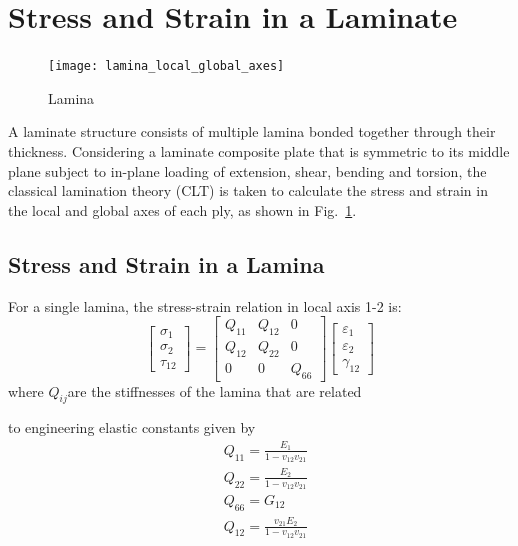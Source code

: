 \documentclass[Afour,sagev,times]{sagej}
\begin{document}
\section{Stress and Strain in a Laminate}
\begin{figure}[!htb]
	\centering
	\texttt{[image: lamina\_local\_global\_axes]}
\caption{Lamina}
  	\label{fig:lamina}
\end{figure}
A laminate structure consists of multiple lamina bonded together through their thickness.
Considering a laminate composite plate that is symmetric to its middle plane subject to in-plane
loading of extension, shear, bending and torsion, the classical lamination theory (CLT) is taken to
calculate the stress and strain in the local and global axes of each ply, as shown in
Fig.~\ref{fig:lamina}.




\subsection{Stress and Strain in a Lamina}
For a single lamina, the stress-strain relation in local axis 1-2 is:
\begin{equation}
    \begin{bmatrix}
        \sigma _1\\
        \sigma _2\\
        \tau_{12}
    \end{bmatrix}
    =
    \begin{bmatrix}
        Q_{11} & Q_{12} & 0\\
        Q_{12} & Q_{22} & 0\\
        0      &  0     & Q_{66}
    \end{bmatrix}
    \begin{bmatrix}
        \varepsilon_1\\
        \varepsilon_2\\\gamma_{12}
    \end{bmatrix}
\end{equation}
where $Q_{ij} $are the stiffnesses of the lamina that are related

to engineering elastic constants given by
\begin{equation}
    \begin{split}
    &Q_{11}=\frac{E_1}{1-v_{12}v_{21}}\\
    &Q_{22}=\frac{E_2}{1-v_{12}v_{21}}\\
    &Q_{66}=G_{12}\\
    &Q_{12}=\frac{v_{21}E_2}{1-v_{12}v_{21}}\\
    \end{split}
\end{equation}
\end{document}
